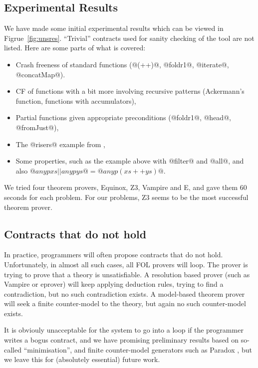 \subsection{Experimental Results}



We have made some initial experimental results which can be viewed in
Figrue~\ref{fig:unsres}. ``Trivial'' contracts used for sanity
checking of the tool are not listed. Here are some parts of what is covered:

\begin{itemize}
  \item Crash freeness of standard functions
    (@(++)@, @foldr1@, @iterate@, @concatMap@).

  \item CF of functions with a bit more involving recursive patterns
        (Ackermann's function, functions with accumulators),

%

  \item Partial functions given appropriate preconditions
        (@foldr1@, @head@, @fromJust@),

  \item The @risers@ example from \citep{catch},

  \item Some properties, such as the example above with @filter@ and @all@,
        and also $@any p xs || any p ys@ = @any p (xs ++ ys)@$.
\end{itemize}

We tried four theorem provers, Equinox, Z3, Vampire and E, and gave
them 60 seconds for each problem. For our problems, Z3 seems to be the most
successful theorem prover.

\subsection{Contracts that do not hold}
\label{ssect:countersat}

In practice, programmers will often propose contracts that do not hold.
Unfortunately, in almost all such cases, all FOL provers will loop.
The prover is trying to prove that a theory is unsatisfiable.  A resolution
based prover (such as Vampire or eprover) will keep applying deduction rules,
trying to find a contradiction, but no such contradiction exists.  A
model-based theorem prover will seek a finite counter-model to the theory, but
again no such counter-model exists. 

It is obviouly unacceptable for the system to go into a loop if
the programmer writes a bogus contract, and we have promising
preliminary results based on so-called ``minimisation'', and
finite counter-model generators such as Paradox \cite{koen}, but we
leave this for (absolutely essential) future work.

